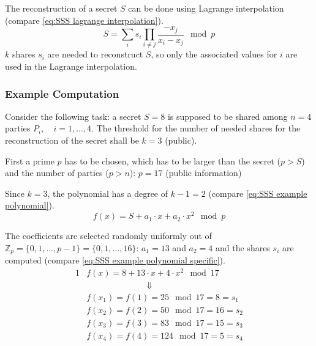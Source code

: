 

The reconstruction of a secret $S$ can be done using Lagrange interpolation (compare \ref{eq:SSS lagrange interpolation}).
\begin{equation}
\label{eq:SSS lagrange interpolation}
S = \sum_i s_i \prod_{i \neq j} \frac{-x_j}{x_i-x_j} \mod p
\end{equation}
$k$ shares $s_i$ are needed to reconstruct $S$, so only the associated values for $i$ are used in the Lagrange interpolation.

\subsubsection*{Example Computation} \label{Example Computation}

Consider the following task: a secret $S=8$ is supposed to be shared among $n=4$ parties $P_i,\quad i=1,...,4$. The threshold for the number of needed shares for the reconstruction of the secret shall be $k=3$ (public).

First a prime $p$ has to be chosen, which has to be larger than the secret ($p>S$) and the number of parties ($p>n$): $p=17$ (public information)

Since $k=3$, the polynomial has a degree of $k-1=2$ (compare \ref{eq:SSS example polynomial}).
\begin{equation}
\label{eq:SSS example polynomial}
f(x) = S + a_1 \cdot x + a_2 \cdot x^2 \mod p
\end{equation}

The coefficients are selected randomly uniformly out of $\mathbb{Z}_p=\{0,1,...,p-1\}=\{0,1,...,16\}$: $a_1=13$ and $a_2=4$ and the shares $s_i$ are computed (compare \ref{eq:SSS example polynomial specific}).
\begin{alignat}{1}
& f(x) = 8 + 13 \cdot x + 4 \cdot x^2 \mod 17 \label{eq:SSS example polynomial specific} \\
&\qquad \qquad \qquad \quad \Downarrow \nonumber \\ 
& f(x_1)=f(1)=25\mod17=8=s_1 \nonumber \\
& f(x_2)=f(2)=50\mod17=16=s_2 \nonumber \\
& f(x_3)=f(3)=83\mod17=15=s_3 \nonumber \\
& f(x_4)=f(4)=124\mod17=5=s_4 \nonumber 
\end{alignat}

